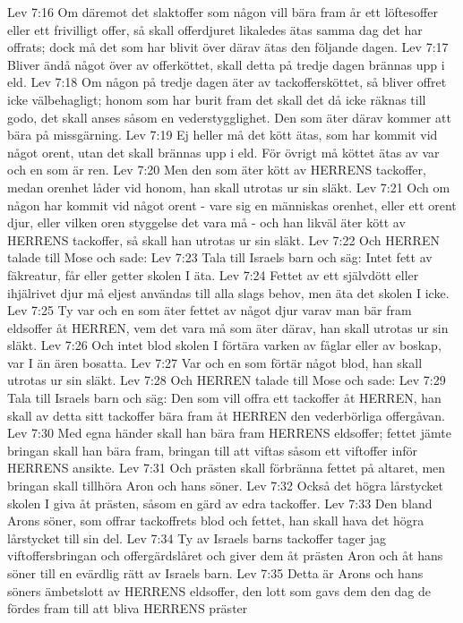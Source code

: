Lev 7:16  Om däremot det slaktoffer som någon vill bära fram år ett löftesoffer eller ett frivilligt offer, så skall offerdjuret likaledes ätas samma dag det har offrats; dock må det som har blivit över därav ätas den följande dagen.
Lev 7:17  Bliver ändå något över av offerköttet, skall detta på tredje dagen brännas upp i eld.
Lev 7:18  Om någon på tredje dagen äter av tackoffersköttet, så bliver offret icke välbehagligt; honom som har burit fram det skall det då icke räknas till godo, det skall anses såsom en vederstygglighet. Den som äter därav kommer att bära på missgärning.
Lev 7:19  Ej heller må det kött ätas, som har kommit vid något orent, utan det skall brännas upp i eld. För övrigt må köttet ätas av var och en som är ren.
Lev 7:20  Men den som äter kött av HERRENS tackoffer, medan orenhet låder vid honom, han skall utrotas ur sin släkt.
Lev 7:21  Och om någon har kommit vid något orent - vare sig en människas orenhet, eller ett orent djur, eller vilken oren styggelse det vara må - och han likväl äter kött av HERRENS tackoffer, så skall han utrotas ur sin släkt.
Lev 7:22  Och HERREN talade till Mose och sade:
Lev 7:23  Tala till Israels barn och säg: Intet fett av fäkreatur, får eller getter skolen I äta.
Lev 7:24  Fettet av ett självdött eller ihjälrivet djur må eljest användas till alla slags behov, men äta det skolen I icke.
Lev 7:25  Ty var och en som äter fettet av något djur varav man bär fram eldsoffer åt HERREN, vem det vara må som äter därav, han skall utrotas ur sin släkt.
Lev 7:26  Och intet blod skolen I förtära varken av fåglar eller av boskap, var I än ären bosatta.
Lev 7:27  Var och en som förtär något blod, han skall utrotas ur sin släkt.
Lev 7:28  Och HERREN talade till Mose och sade:
Lev 7:29  Tala till Israels barn och säg: Den som vill offra ett tackoffer åt HERREN, han skall av detta sitt tackoffer bära fram åt HERREN den vederbörliga offergåvan.
Lev 7:30  Med egna händer skall han bära fram HERRENS eldsoffer; fettet jämte bringan skall han bära fram, bringan till att viftas såsom ett viftoffer inför HERRENS ansikte.
Lev 7:31  Och prästen skall förbränna fettet på altaret, men bringan skall tillhöra Aron och hans söner.
Lev 7:32  Också det högra lårstycket skolen I giva åt prästen, såsom en gärd av edra tackoffer.
Lev 7:33  Den bland Arons söner, som offrar tackoffrets blod och fettet, han skall hava det högra lårstycket till sin del.
Lev 7:34  Ty av Israels barns tackoffer tager jag viftoffersbringan och offergärdslåret och giver dem åt prästen Aron och åt hans söner till en evärdlig rätt av Israels barn.
Lev 7:35  Detta är Arons och hans söners ämbetslott av HERRENS eldsoffer, den lott som gavs dem den dag de fördes fram till att bliva HERRENS präster
